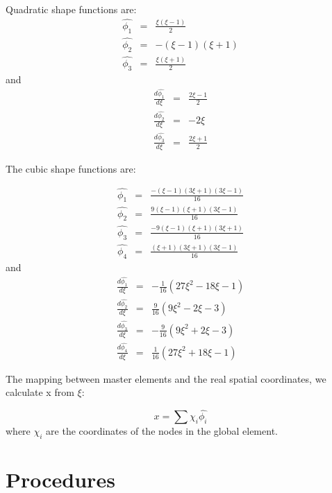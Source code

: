 \documentclass[paper=a4, fontsize=11pt]{article} %
\begin{document}
Quadratic shape functions are:
\begin{eqnarray}
\hat{\phi_1} &=& \frac{\xi(\xi-1)}{2} \nonumber\\
\hat{\phi_2} &=& -(\xi-1)(\xi+1)\nonumber\\
\hat{\phi_3} &=& \frac{\xi(\xi+1)} {2}
\end{eqnarray}
and 
\begin{eqnarray}
\frac{d\hat{\phi_1}}{d\xi} &=& \frac{2\xi-1}{2} \nonumber\\
\frac{d\hat{\phi_2}}{d\xi} &=& -2\xi \nonumber\\
\frac{d\hat{\phi_3}}{d\xi} &=& \frac{2\xi+1}{2}
\end{eqnarray}

The cubic shape functions are:

\begin{eqnarray}
\hat{\phi_1} &=& \frac{-(\xi-1)(3\xi+1)(3\xi-1)}{16} \nonumber\\
\hat{\phi_2} &=& \frac{9(\xi-1)(\xi+1)(3\xi-1)}{16} \nonumber\\
\hat{\phi_3} &=& \frac{-9(\xi-1)(\xi+1)(3\xi+1)}{16} \nonumber\\
\hat{\phi_4} &=& \frac{(\xi+1)(3\xi+1)(3\xi-1)}{16}
\end{eqnarray}
and
\begin{eqnarray}
\frac{d\hat{\phi_1}}{d\xi} &=& -\frac{1}{16} (27\xi^2 - 18\xi -1) \nonumber\\
\frac{d\hat{\phi_2}}{d\xi} &=& \frac{9}{16} (9\xi^2 -2\xi -3) \nonumber\\
\frac{d\hat{\phi_3}}{d\xi} &=& -\frac{9}{16} (9\xi^2 + 2\xi -3) \nonumber\\
\frac{d\hat{\phi_4}}{d\xi} &=& \frac{1}{16} (27\xi^2 + 18\xi-1)      
\end{eqnarray}

The mapping between master elements and the real spatial coordinates, we calculate x from $\xi$:

\begin{equation}
x = \sum{\chi _i \hat{\phi _i}}
\end{equation} 
where $\chi_i$ are the coordinates of the nodes in the global element.  

\section{Procedures}
\end{document}
